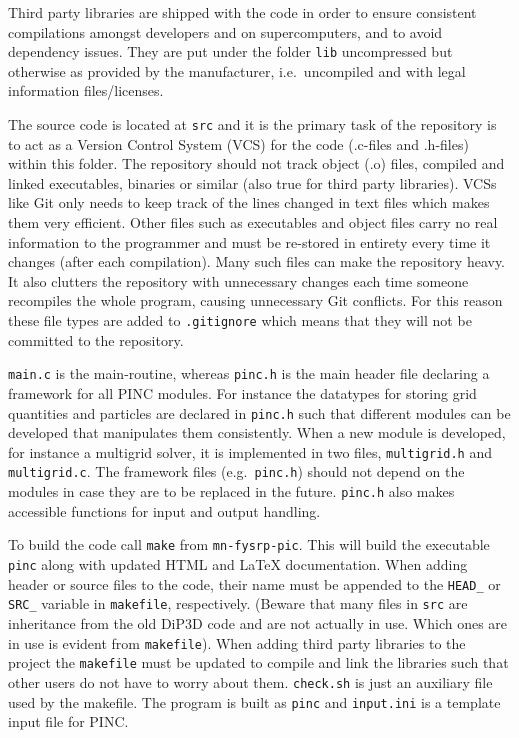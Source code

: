 \documentclass[10pt,a4paper]{article}
\begin{document}
Third party libraries are shipped with the code in order to ensure consistent compilations amongst developers and on supercomputers, and to avoid dependency issues. They are put under the folder \verb$lib$ uncompressed but otherwise as provided by the manufacturer, i.e.\ uncompiled and with legal information files/licenses.

The source code is located at \verb$src$ and it is the primary task of the repository is to act as a Version Control System (VCS) for the code (.c-files and .h-files) within this folder. The repository should not track object (.o) files, compiled and linked executables, binaries or similar (also true for third party libraries). VCSs like Git only needs to keep track of the lines changed in text files which makes them very efficient. Other files such as executables and object files carry no real information to the programmer and must be re-stored in entirety every time it changes (after each compilation). Many such files can make the repository heavy. It also clutters the repository with unnecessary changes each time someone recompiles the whole program, causing unnecessary Git conflicts. For this reason these file types are added to \verb$.gitignore$ which means that they will not be committed to the repository.

\verb$main.c$ is the main-routine, whereas \verb$pinc.h$ is the main header file declaring a framework for all PINC modules. For instance the datatypes for storing grid quantities and particles are declared in \verb$pinc.h$ such that different modules can be developed that manipulates them consistently. When a new module is developed, for instance a multigrid solver, it is implemented in two files, \verb$multigrid.h$ and \verb$multigrid.c$. The framework files (e.g.\ \verb$pinc.h$) should not depend on the modules in case they are to be replaced in the future. \verb$pinc.h$ also makes accessible functions for input and output handling.

To build the code call \verb$make$ from \verb$mn-fysrp-pic$. This will build the executable \verb$pinc$ along with updated HTML and \LaTeX{} documentation. When adding header or source files to the code, their name must be appended to the \verb$HEAD_$ or \verb$SRC_$ variable in \verb$makefile$, respectively. (Beware that many files in \verb$src$ are inheritance from the old DiP3D code and are not actually in use. Which ones are in use is evident from \verb$makefile$). When adding third party libraries to the project the \verb$makefile$ must be updated to compile and link the libraries such that other users do not have to worry about them. \verb$check.sh$ is just an auxiliary file used by the makefile. The program is built as \verb$pinc$ and \verb$input.ini$ is a template input file for PINC.
\end{document}
